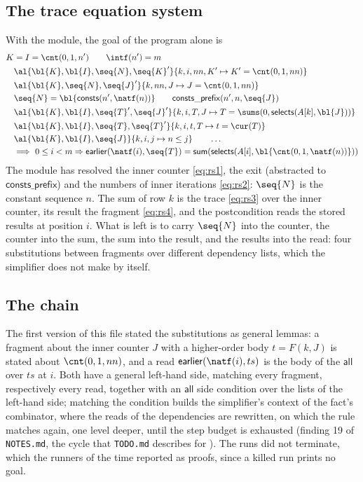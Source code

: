 \subsection{The trace equation system}
With the module, the goal of the program alone is
\begin{align}
  K &= I = \cnt(0, 1, n') \qquad \intf(n') = m \label{eq:rs0}\\
  &\al{\bl{K}, \bl{I}, \seq{N}, \seq{K}'}{k, i, nn, K' \mapsto K' = \cnt(0, 1, nn)} \nonumber\\
  &\al{\bl{K}, \seq{N}, \seq{J}'}{k, nn, J \mapsto J = \cnt(0, 1, nn)} \label{eq:rs1}\\
  &\seq{N} = \bl{\mathsf{consts}(n', \natf(n))} \qquad \mathsf{consts\_prefix}(n', n, \seq{J}) \label{eq:rs2}\\
  &\al{\bl{K}, \bl{I}, \seq{T}', \seq{J}'}{k, i, T, J \mapsto T = \sums(0, \mathsf{selects}(A[k], \bl{J}))} \label{eq:rs3}\\
  &\al{\bl{K}, \bl{I}, \seq{T}, \seq{T}'}{k, i, t, T \mapsto t = \cur(T)} \label{eq:rs4}\\
  &\al{\bl{K}, \bl{I}, \seq{J}}{k, i, j \mapsto n \le j} \qquad \ldots \nonumber\\
  &\Longrightarrow\ 0 \le i < m \Rightarrow \mathsf{earlier}(\natf(i), \seq{T}) = \mathsf{sum}(\mathsf{selects}(A[i], \bl{\cnt(0, 1, \natf(n))})) \nonumber
\end{align}
The module has resolved the inner counter \eqref{eq:rs1}, the exit (abstracted to $\mathsf{consts\_prefix}$)
and the numbers of inner iterations \eqref{eq:rs2}: $\seq{N}$ is the constant sequence $n$. The sum of
row $k$ is the trace \eqref{eq:rs3} over the inner counter, its result the fragment \eqref{eq:rs4}, and the
postcondition reads the stored results at position $i$. What is left is to carry $\seq{N}$ into the counter,
the counter into the sum, the sum into the result, and the results into the read: four substitutions
between fragments over different dependency lists, which the simplifier does not make by itself.

\subsection{The chain}
The first version of this file stated the substitutions as general lemmas: a fragment about the inner
counter $J$ with a higher-order body $t = F(k, J)$ is stated about $\cnt(0, 1, nn)$, and a read
$\mathsf{earlier}(\natf(i), ts)$ is the body of the $\mathsf{all}$ over $ts$ at $i$. Both have a general
left-hand side, matching every fragment, respectively every read, together with an $\mathsf{all}$ side
condition over the lists of the left-hand side; matching the condition builds the simplifier's context of
the fact's combinator, where the reads of the dependencies are rewritten, on which the rule matches again,
one level deeper, until the step budget is exhausted (finding 19 of \texttt{NOTES.md}, the cycle that
\texttt{TODO.md} describes for ). The runs did not terminate, which the runners of
the time reported as proofs, since a killed run prints no goal.

